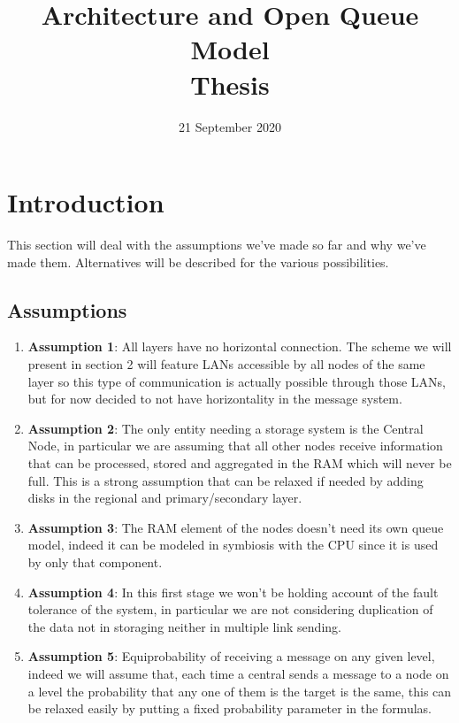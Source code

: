 \documentclass[11pt]{article}
\title {Architecture and Open Queue Model \\ \bigskip \large Thesis}
\date{21 September 2020}
\begin{document}
\maketitle
\section{Introduction}
This section will deal with the assumptions we've made so far and why we've made them. Alternatives will be described for the various possibilities.\\
\subsection{Assumptions}
\begin{enumerate}
\item \textbf{Assumption 1}: All layers have no horizontal connection. The scheme we will present in section 2 will feature LANs accessible by all nodes of the same layer so this type of communication is actually possible through those LANs, but for now decided to not have horizontality in the message system.
\item \textbf{Assumption 2}: The only entity needing a storage system is the Central Node, in particular we are assuming that all other nodes receive information that can be processed, stored and aggregated in the RAM which will never be full. This is a strong assumption that can be relaxed if needed by adding disks in the regional and primary/secondary layer.
\item \textbf{Assumption 3}: The RAM element of the nodes doesn't need its own queue model, indeed it can be modeled in symbiosis with the CPU since it is used by only that component.
\item \textbf{Assumption 4}: In this first stage we won't be holding account of the fault tolerance of the system, in particular we are not considering duplication of the data not in storaging neither in multiple link sending.
\item \textbf{Assumption 5}: Equiprobability of receiving a message on any given level, indeed we will assume that, each time a central sends a message to a node on a level the probability that any one of them is the target is the same, this can be relaxed easily by putting a fixed probability parameter in the formulas.
\end{enumerate}
\end{document}
